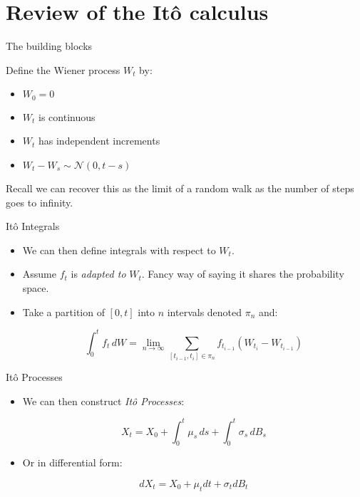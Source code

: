 \documentclass[11pt]{beamer}
\begin{document}
\section{Review of the It\^{o} calculus}
\begin{frame}{The building blocks}

Define the Wiener process $W_t$ by:

\begin{itemize}
\item $W_0= 0$

\item $W_t$ is continuous 

\item $W_t$ has independent increments

\item $W_{t}-W_{s}\sim {\mathcal {N}}(0,t-s)$

\end{itemize}

\vfill

Recall we can recover this as the limit of a random walk as the number of steps goes to infinity. 

\end{frame}
\begin{frame}{It\^{o} Integrals}

\begin{itemize}

\item We can then define integrals with respect to $W_t$.
\vfill
\item Assume $f_t$ is \emph{adapted to} $W_t$. Fancy way of saying it shares the probability space. 
\vfill
\item Take a partition of $[0,t]$ into $n$ intervals denoted $\pi_n$ and:

$$ \int _{0}^{t}f_t\,dW=\lim _{n\rightarrow \infty }\sum _{[t_{i-1},t_{i}]\in \pi _{n}}f_{t_{i-1}}(W_{t_{i}}-W_{t_{i-1}}) $$

\end{itemize}

\end{frame}
\begin{frame}{It\^{o} Processes}

\begin{itemize}
\item We can then construct \emph{It\^{o} Processes}: 

$$ X_{t}=X_{0}+ \int _{0}^{t}\mu _{s}\,ds + \int _{0}^{t}\sigma _{s}\,dB_{s} $$

\vfill

\item Or in differential form:

$$ dX_{t}=X_{0}+ \mu _{t}dt + \sigma _{t}dB_{t} $$
\end{itemize}

\end{frame}
\end{document}
